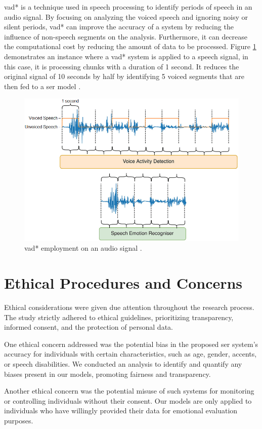 \ac{vad*} is a technique used in speech processing to identify periods of speech in an audio signal. By focusing on analyzing the voiced speech and ignoring noisy or silent periods, \ac{vad*} can improve the accuracy of a system by reducing the influence of non-speech segments on the analysis. Furthermore, it can decrease the computational cost by reducing the amount of data to be processed. Figure \ref{fig:vad} demonstrates an instance where a \ac{vad*} system is applied to a speech signal, in this case, it is processing chunks with a duration of 1 second. It reduces the original signal of 10 seconds by half by identifying 5 voiced segments that are then fed to a \ac{ser} model \cite{Milling2022}.

\begin{figure}
	\centering
	\includegraphics[width=.7\linewidth]{figs/3_methodology/speech_activity_detection.png}
	\caption{\acl{vad*} employment on an audio signal \cite{Milling2022}.}
	\label{fig:vad}
\end{figure}



\section{Ethical Procedures and Concerns}

Ethical considerations were given due attention throughout the research process. The study strictly adhered to ethical guidelines, prioritizing transparency, informed consent, and the protection of personal data.

One ethical concern addressed was the potential bias in the proposed \ac{ser} system's accuracy for individuals with certain characteristics, such as age, gender, accents, or speech disabilities. We conducted an analysis to identify and quantify any biases present in our models, promoting fairness and transparency.

Another ethical concern was the potential misuse of such systems for monitoring or controlling individuals without their consent. Our models are only applied to individuals who have willingly provided their data for emotional evaluation purposes.

